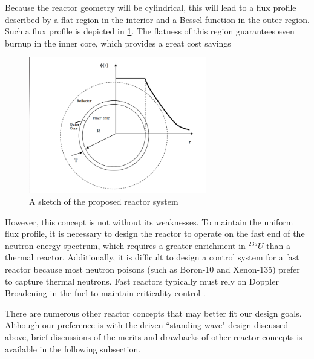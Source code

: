 \documentclass[12pt]{article}
\begin{document}
Because the reactor geometry will be cylindrical, this will lead to a flux profile described by a flat region in the interior and a Bessel function in the outer region. Such a flux profile is depicted in \ref{f:standing-wave}. The flatness of this region guarantees even burnup in the inner core, which provides a great cost savings 

\begin{figure}[H]                                  
    \centering                                     
    \includegraphics[width=0.69\textwidth]{standing-wave}   
    \caption{A sketch of the proposed reactor system}                          
    \label{f:standing-wave}     
\end{figure}     

However, this concept is not without its weaknesses. To maintain the uniform flux profile, it is necessary to design the reactor to operate on the fast end of the neutron energy spectrum, which requires a greater enrichment in $^{235}U$ than a thermal reactor. Additionally, it is difficult to design a control system for a fast reactor because most neutron poisons (such as Boron-10 and Xenon-135) prefer to capture thermal neutrons. Fast reactors typically must rely on Doppler Broadening in the fuel to maintain criticality control \cite{ebr2}.

There are numerous other reactor concepts that may better fit our design goals. Although our preference is with the driven ``standing wave" design discussed above, brief discussions of the merits and drawbacks of other reactor concepts is available in the following subsection.
\end{document}
